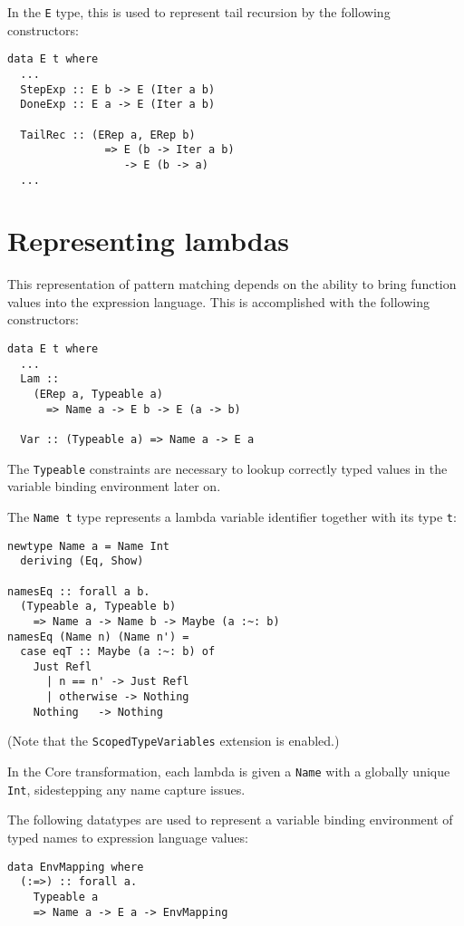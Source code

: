 \documentclass[sigplan,screen]{acmart}
\newcommand{\ttt}{\texttt}
\begin{document}
In the \ttt{E} type, this is used to represent tail recursion by
the following constructors:

\begin{lstlisting}
data E t where
  ...
  StepExp :: E b -> E (Iter a b)
  DoneExp :: E a -> E (Iter a b)

  TailRec :: (ERep a, ERep b)
               => E (b -> Iter a b)
                  -> E (b -> a)
  ...
\end{lstlisting}

\section{Representing lambdas}
This representation of pattern matching depends on the ability to bring
function values into the expression language. This is accomplished
with the following constructors:

\begin{lstlisting}
data E t where
  ...
  Lam ::
    (ERep a, Typeable a)
      => Name a -> E b -> E (a -> b)

  Var :: (Typeable a) => Name a -> E a
\end{lstlisting}

The \ttt{Typeable} constraints are necessary to lookup correctly typed
values in the variable binding environment later on.

The \ttt{Name t} type represents a lambda variable identifier together with its
type \ttt{t}:

\begin{lstlisting}
newtype Name a = Name Int
  deriving (Eq, Show)

namesEq :: forall a b.
  (Typeable a, Typeable b)
    => Name a -> Name b -> Maybe (a :~: b)
namesEq (Name n) (Name n') =
  case eqT :: Maybe (a :~: b) of
    Just Refl
      | n == n' -> Just Refl
      | otherwise -> Nothing
    Nothing   -> Nothing
\end{lstlisting}

(Note that the \ttt{ScopedTypeVariables} extension is enabled.)

In the Core transformation, each lambda is given a \ttt{Name} with a globally
unique \ttt{Int}, sidestepping any name capture issues.

The following datatypes are used to represent a variable binding environment
of typed names to expression language values:

\begin{lstlisting}
data EnvMapping where
  (:=>) :: forall a.
    Typeable a
    => Name a -> E a -> EnvMapping
\end{lstlisting}
\end{document}
